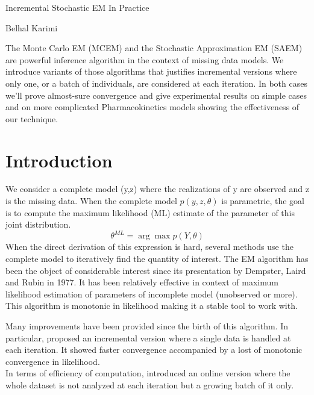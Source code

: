 \documentclass[a4paper]{article}
\theoremstyle{plain}
\theoremstyle{plain}
\theoremstyle{definition}
\begin{document}

\Large
 \begin{center}
Incremental Stochastic EM In Practice

\hspace{10pt}

\large
Belhal Karimi

\hspace{10pt}

\end{center}

\hspace{10pt}

\normalsize



 \noindent The Monte Carlo EM (MCEM) and the Stochastic Approximation EM (SAEM) are powerful inference algorithm in the context of missing data models. We introduce variants of those algorithms that justifies incremental versions where only one, or a batch of individuals, are considered at each iteration. In both cases we'll prove almost-sure convergence and give experimental results on simple cases and on more complicated Pharmacokinetics models showing the effectiveness of our technique.


\section{Introduction}
We consider a complete model (y,z) where the realizations of y are observed and z is the missing data. When the complete model $p(y,z,\theta)$ is parametric, the goal is to compute the maximum likelihood (ML) estimate of the parameter of this joint distribution.
\begin{equation}
\theta^{ML} = \arg\max p(Y,\theta)
\end{equation}
When the direct derivation of this expression is hard, several methods use the complete model to iteratively find the quantity of interest.
The EM algorithm has been the object of considerable interest since its presentation by Dempster, Laird and Rubin in 1977. It has been relatively effective in context of maximum likelihood estimation of parameters of incomplete model (unobserved or more). This algorithm is monotonic in likelihood making it a stable tool to work with.

Many improvements have been provided since the birth of this algorithm. In particular, \citep{neal} proposed an incremental version where a single data is handled at each iteration. It showed faster convergence accompanied by a lost of monotonic convergence in likelihood.\\
In terms of efficiency of computation, \citep{fort, cappe} introduced an online version where the whole dataset is not analyzed at each iteration but a growing batch of it only.
\end{document}
